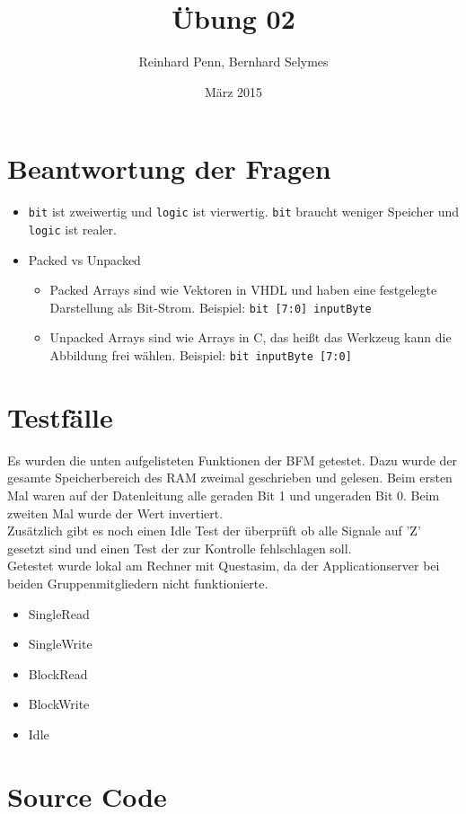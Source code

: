 \documentclass[12pt,a4paper]{article}
\begin{document}
\title{Übung 02}
\author{Reinhard Penn, Bernhard Selymes}
\date{März 2015}

\normalsize


\newcommand{\Uebung}{BFMSV}
\newcommand{\srcpath}{../../src}
\newcommand{\simpath}{../../sim}



\section{Beantwortung der Fragen}

\begin{itemize}
	\item \texttt{bit} ist zweiwertig und \texttt{logic} ist vierwertig. \texttt{bit} braucht weniger Speicher und \texttt{logic} ist realer.
	\item Packed vs Unpacked
		\begin{itemize}
			\item Packed Arrays sind wie Vektoren in VHDL und haben eine festgelegte Darstellung als Bit-Strom. Beispiel: \texttt{bit [7:0] inputByte}
			\item Unpacked Arrays sind wie Arrays in C, das heißt das Werkzeug kann die Abbildung frei wählen. Beispiel: \texttt{bit inputByte [7:0]}
		\end{itemize}
\end{itemize}


\section{Testfälle}
Es wurden die unten aufgelisteten Funktionen der BFM getestet. Dazu wurde der gesamte Speicherbereich des RAM zweimal geschrieben und gelesen. Beim ersten Mal waren auf der Datenleitung alle geraden Bit 1 und ungeraden Bit 0. Beim zweiten Mal wurde der Wert invertiert. 
\\
Zusätzlich gibt es noch einen Idle Test der überprüft ob alle Signale auf 'Z' gesetzt sind und einen Test der zur Kontrolle fehlschlagen soll.
\\
Getestet wurde lokal am Rechner mit Questasim, da der Applicationserver bei beiden Gruppenmitgliedern nicht funktionierte.

\begin{itemize}
	\item SingleRead
	\item SingleWrite
	\item BlockRead
	\item BlockWrite
	\item Idle
\end{itemize}

\section{Source Code}





\end{document}
